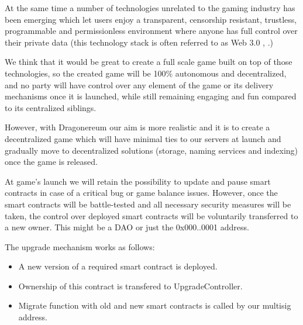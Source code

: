 \documentclass[12pt]{article}
\begin{document}
At the same time a number of technologies unrelated to the gaming industry has been emerging which let users enjoy a transparent, censorship resistant, trustless, programmable and permissionless environment where anyone has full control over their private data (this technology stack is often referred to as Web 3.0  \cite{Josh_Stark_2018_Jun_6},  \cite{Stephan_Tual_2017_May_26}.)\par

We think that it would be great to create a full scale game built on top of those technologies, so the created game will be 100$\%$  autonomous and decentralized, and no party will have control over any element of the game or its delivery mechanisms once it is launched, while still remaining engaging and fun compared to its centralized siblings.\par

However, with Dragonereum our aim is more realistic and it is to create a decentralized game which will have minimal ties to our servers at launch and gradually move to decentralized solutions (storage, naming services and indexing) once the game is released.\par

At game's launch we will retain the possibility to update and pause smart contracts in case of a critical bug or game balance issues. However, once the smart contracts will be battle-tested and all necessary security measures will be taken, the control over deployed smart contracts will be voluntarily transferred to a new owner. This might be a DAO or just the 0x000..0001 address.\par

\begin{samepage}
The upgrade mechanism works as follows:\par

\begin{itemize}
\item A new version of a required smart contract is deployed.\par

\item Ownership of this contract is transfered to UpgradeController.\par

\item Migrate function with old and new smart contracts is called by our multisig address.
\end{itemize}\par
\end{samepage}
\end{document}
